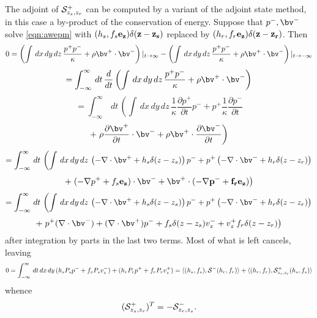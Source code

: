 The adjoint of ${\cal S}^+_{z_s,z_r}$ can be computed by a variant of
the adjoint state method, in this case a by-product of the
conservation of energy. Suppose that $p^-,\bv^-$ solve \ref{eqn:awepm}
with $(h_s,f_s\bf{e}_z)\delta(z-z_s)$ replaced by
$ (h_r,f_r\bf{e}_z) \delta(z-z_r)$. Then
\[
0 = 
\left(\int\, dx\,dy\,dz\, \frac{p^+ p^-}{\kappa} +  
\rho \bv^+ \cdot \bv^- \right)|_{t \rightarrow \infty}
-
\left(\int\, dx\,dy\,dz\, \frac{p^+ p^-}{\kappa} +  \rho \bv^+ \cdot \bv^- \right)|_{t \rightarrow -\infty}
\]
\[
= 
\int_{-\infty}^{\infty} \,dt\, \frac{d}{dt}\left(\int\, dx\,dy\,dz\, \frac{p^+ p^-}{\kappa} +  \rho \bv^+ \cdot \bv^- \right)
\]
\[
= 
\int_{-\infty}^{\infty} \,dt\, \left(\int\, dx\,dy\,dz\, \frac{1}{\kappa} \frac{\partial p^+}{\partial t} p^- +  p^+ \frac{1}{\kappa}\frac{\partial p^-}{\partial t} \right.
\]
\[
+
\left. \rho \frac{\partial \bv^+}{\partial t} \cdot \bv^- + \rho \bv^+ \cdot \frac{\partial \bv^-}{\partial t} \right)
\]
\[
= 
\int_{-\infty}^{\infty} \,dt\, \left(\int\, dx\,dy\,dz\, \left(- \nabla \cdot \bv^+ + 
 h_s \delta(z-z_s)\right) p^- + p^+ \left(- \nabla \cdot \bv^- + 
 h_r \delta(z-z_r)\right) \right.
\]
\[
+
\left.  (- \nabla p^++f_s\bf{e}_z) \cdot \bv^- + \bv^+ \cdot (-\nabla
  p^- + f_r \bf{e_z}) \right)
\]
\[
= 
\int_{-\infty}^{\infty}\,dt\, \left(\int\, dx\,dy\,dz\, \left(- \nabla \cdot \bv^+ + 
 h_s \delta(z-z_s)\right) p^- + p^+ \left(- \nabla \cdot \bv^- + 
 h_r \delta(z-z_r)\right) \right.
\]
\[
+
\left.  p^+ (\nabla \cdot \bv^-) + (\nabla \cdot \bv^+) p^- 
  +f_s \delta(z-z_s) v_z^- + v_z^+f_r \delta(z-z_r) \right)
\]
after integration by parts in the last two terms. Most of what is left cancels, leaving 
\[
0 = \int_{-\infty}^{\infty}\,dt\,dx\,dy\, (h_sP_sp^-+f_zP_sv_z^-) +
( h_rP_rp^++f_rP_rv_z^+) = \langle (h_s,f_s), {\cal S}^-(h_r,f_r) \rangle+ \langle (h_r,f_r), {\cal S}^+_{z_s,z_r}(h_s,f_s) \rangle
\]
whence
\begin{equation}
\label{eqn:sadj}
 ({\cal S}^+_{z_s,z_r})^T = -{\cal S}^{-}_{z_r,z_s}.
\end{equation}

